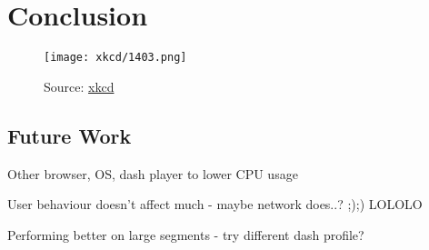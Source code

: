 \chapter{Conclusion}
\label{cha:conclusion}



\begin{figure}[ht]
    \centering
    \texttt{[image: xkcd/1403.png]}
    \caption*{Source: \href{https://xkcd.com/1403/}{xkcd}}
\end{figure}

\section{Future Work}
Other browser, OS, dash player to lower CPU usage

User behaviour doesn't affect much - maybe network does..? ;);) LOLOLO

Performing better on large segments - try different dash profile?

